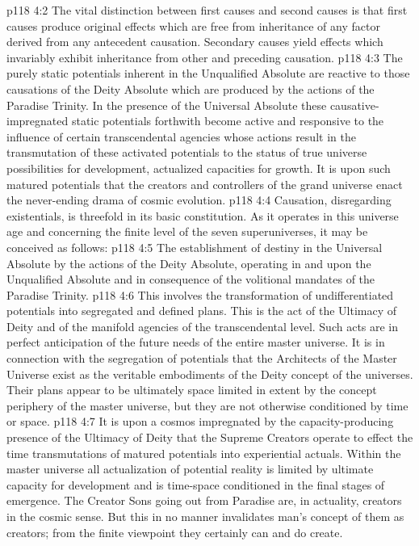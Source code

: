\vs p118 4:2 The vital distinction between first causes and second causes is that first causes produce original effects which are free from inheritance of any factor derived from any antecedent causation. Secondary causes yield effects which invariably exhibit inheritance from other and preceding causation.
\vs p118 4:3 \pc The purely static potentials inherent in the Unqualified Absolute are reactive to those causations of the Deity Absolute which are produced by the actions of the Paradise Trinity. In the presence of the Universal Absolute these causative\hyp{}impregnated static potentials forthwith become active and responsive to the influence of certain transcendental agencies whose actions result in the transmutation of these activated potentials to the status of true universe possibilities for development, actualized capacities for growth. It is upon such matured potentials that the creators and controllers of the grand universe enact the never\hyp{}ending drama of cosmic evolution.
\vs p118 4:4 Causation, disregarding existentials, is threefold in its basic constitution. As it operates in this universe age and concerning the finite level of the seven superuniverses, it may be conceived as follows:
\vs p118 4:5 \bibnobreakspace {} The establishment of destiny in the Universal Absolute by the actions of the Deity Absolute, operating in and upon the Unqualified Absolute and in consequence of the volitional mandates of the Paradise Trinity.
\vs p118 4:6 \bibnobreakspace {} This involves the transformation of undifferentiated potentials into segregated and defined plans. This is the act of the Ultimacy of Deity and of the manifold agencies of the transcendental level. Such acts are in perfect anticipation of the future needs of the entire master universe. It is in connection with the segregation of potentials that the Architects of the Master Universe exist as the veritable embodiments of the Deity concept of the universes. Their plans appear to be ultimately space limited in extent by the concept periphery of the master universe, but  they are not otherwise conditioned by time or space.
\vs p118 4:7 \bibnobreakspace {} It is upon a cosmos impregnated by the capacity\hyp{}producing presence of the Ultimacy of Deity that the Supreme Creators operate to effect the time transmutations of matured potentials into experiential actuals. Within the master universe all actualization of potential reality is limited by ultimate capacity for development and is time\hyp{}space conditioned in the final stages of emergence. The Creator Sons going out from Paradise are, in actuality,  creators in the cosmic sense. But this in no manner invalidates man’s concept of them as creators; from the finite viewpoint they certainly can and do create.
